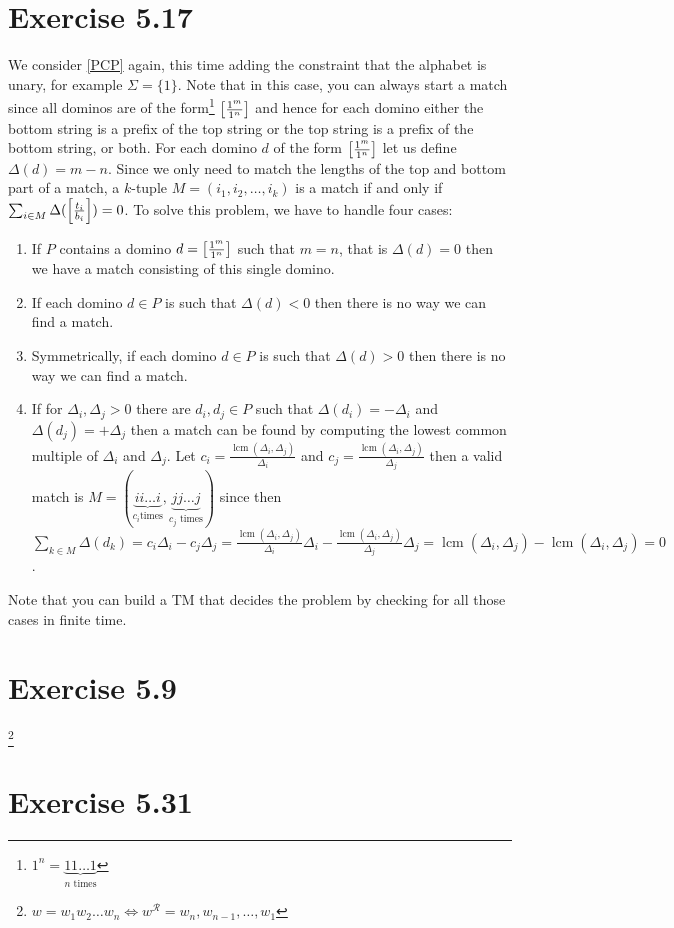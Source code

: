 \documentclass{article}
\begin{document}
\section{Exercise 5.17}
We consider \ref{PCP} again, this time adding the constraint that the alphabet
is unary, for example \(\Sigma = \{1\}\). Note that in this case, you can always start a
match since all dominos are of the form\footnote{\(1^n = \underbrace{11\ldots1}_{n \text{ times}}\)}
\(\mleft[\frac{1^m}{1^n}\mright]\)
and hence for each domino either the bottom string is a prefix of the top
string or the top string is a prefix of the bottom string, or both.
For each domino \(d\) of the form \(\mleft[\frac{1^m}{1^n}\mright]\) let us
define \(\Delta(d) = m - n\). Since we only need to match the lengths of the
top and bottom part of a match, a \(k\)-tuple \(M = (i_1,i_2,\ldots,i_k)\)
is a match if and only if \(\sum_{i \in M}
	\Delta(\mleft[\frac{t_i}{b_i}\mright]) = 0\).
To solve this problem, we have to handle four cases:
\begin{enumerate}
	\item If \(P\) contains a domino \(d=\mleft[\frac{1^m}{1^n}\mright]\) such that
		\(m=n\), that is \(\Delta(d) = 0\) then we have a match consisting of this single domino.
	\item If each domino \(d \in P\) is such that \(\Delta(d) < 0\) then there
		is no way we can find a match.
	\item Symmetrically, if each domino \(d \in P\) is such that \(\Delta(d) > 0\) then there
		is no way we can find a match.
	\item If for \(\Delta_i, \Delta_j > 0\) there are \(d_i,d_j \in P\) such
		that \(\Delta(d_i) = -\Delta_i\) and \(\Delta(d_j) = +\Delta_j\) then a
		match can be found by computing the lowest common multiple of
		\(\Delta_i\) and \(\Delta_j\). Let \(c_i =
			\frac{\mathop{lcm}(\Delta_i,\Delta_j)}{\Delta_i}\) and \(c_j =
			\frac{\mathop{lcm}(\Delta_i,\Delta_j)}{\Delta_j}\) then a valid
			match is \(M = (\underbrace{i i \ldots i}_{c_i \text{
							times}},\underbrace{j j \ldots j}_{c_j
			\text{ times}})\) since then \(\sum_{k \in M}
	\Delta(d_k) = c_i \Delta_i - c_j \Delta_j
= \frac{\mathop{lcm}(\Delta_i,\Delta_j)}{\Delta_i} \Delta_i -
\frac{\mathop{lcm}(\Delta_i,\Delta_j)}{\Delta_j} \Delta_j
=\mathop{lcm}(\Delta_i,\Delta_j) - \mathop{lcm}(\Delta_i,\Delta_j)
= 0\).
\end{enumerate}
Note that you can build a TM that decides the problem by checking for all those
cases in finite time.

\section{Exercise 5.9}

\footnote{\(w = w_1 w_2 \ldots w_n \iff w^{\mathcal{R}} = w_{n} , w_{n-1}, \ldots, w_{1}\)}

\section{Exercise 5.31}
\end{document}
